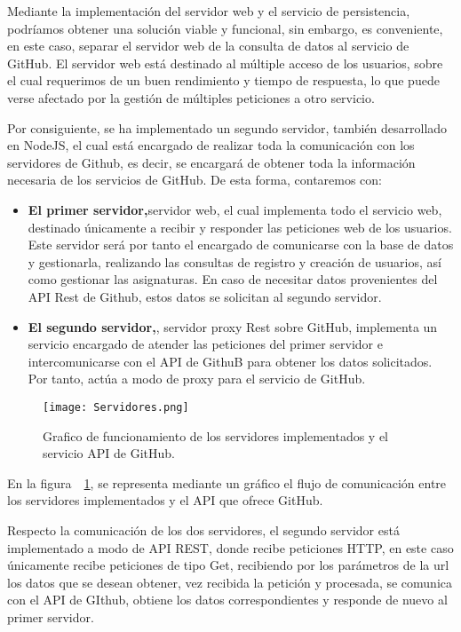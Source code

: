 Mediante la implementación del servidor web y el servicio de persistencia, podríamos obtener una solución viable y funcional, sin embargo, es conveniente, en este caso, separar el servidor web de la consulta de datos al servicio de GitHub. El servidor web está destinado al múltiple acceso de los usuarios, sobre el cual requerimos de un buen rendimiento y tiempo de respuesta, lo que puede verse afectado por la gestión de múltiples peticiones a otro servicio.

Por consiguiente, se ha implementado un segundo servidor, también desarrollado en NodeJS, el cual está encargado de realizar toda la comunicación con los servidores de Github, es decir, se encargará de obtener toda la información necesaria de los servicios de GitHub. De esta forma, contaremos con:
\begin{itemize}
  \item \textbf{El primer servidor,}servidor web, el cual implementa todo el servicio web, destinado únicamente a recibir y responder las peticiones web de los usuarios. Este servidor será por tanto el encargado de comunicarse con la base de datos y gestionarla, realizando las consultas de registro y creación de usuarios, así como gestionar las asignaturas. En caso de necesitar datos provenientes del API Rest de Github, estos datos se solicitan al segundo servidor.
  \item \textbf{El segundo servidor,}, servidor proxy Rest sobre GitHub, implementa un servicio encargado de atender las peticiones del primer servidor e intercomunicarse con el API de GithuB para obtener los datos solicitados. Por tanto, actúa a modo de proxy para el servicio de GitHub.


\end{itemize}

\begin{figure}[h!]
  \centerline{\texttt{[image: Servidores.png]}}
  \caption{Grafico de funcionamiento de los servidores implementados y el servicio API de GitHub.}
  \label{figure:servidores}
\end{figure}
En la figura~~\ref{figure:servidores}, se representa mediante un gráfico el flujo de comunicación entre los servidores implementados y el API que ofrece GitHub.

Respecto la comunicación de los dos servidores, el segundo servidor está implementado a modo de API REST, donde recibe peticiones HTTP, en este caso únicamente recibe peticiones de tipo Get, recibiendo por los parámetros de la url los datos que se desean obtener, vez recibida la petición y procesada, se comunica con el API de GIthub, obtiene los datos correspondientes y responde de nuevo al primer servidor.

